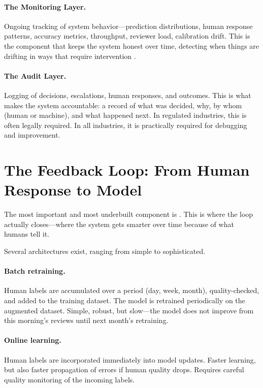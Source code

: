 \paragraph{The Monitoring Layer.} Ongoing tracking of system behavior---prediction distributions, human response patterns, accuracy metrics, throughput, reviewer load, calibration drift. This is the component that keeps the system honest over time, detecting when things are drifting in ways that require intervention \autocite{beyer2016sre}.

\paragraph{The Audit Layer.} Logging of decisions, escalations, human responses, and outcomes. This is what makes the system accountable: a record of what was decided, why, by whom (human or machine), and what happened next. In regulated industries, this is often legally required. In all industries, it is practically required for debugging and improvement.

\section{The Feedback Loop: From Human Response to Model}
\label{sec:ch08-feedback-loop}

The most important and most underbuilt component is . This is where the loop actually closes---where the system gets smarter over time because of what humans tell it.

Several architectures exist, ranging from simple to sophisticated.

\paragraph{Batch retraining.} Human labels are accumulated over a period (day, week, month), quality-checked, and added to the training dataset. The model is retrained periodically on the augmented dataset. Simple, robust, but slow---the model does not improve from this morning's reviews until next month's retraining.

\paragraph{Online learning.} Human labels are incorporated immediately into model updates. Faster learning, but also faster propagation of errors if human quality drops. Requires careful quality monitoring of the incoming labels.

